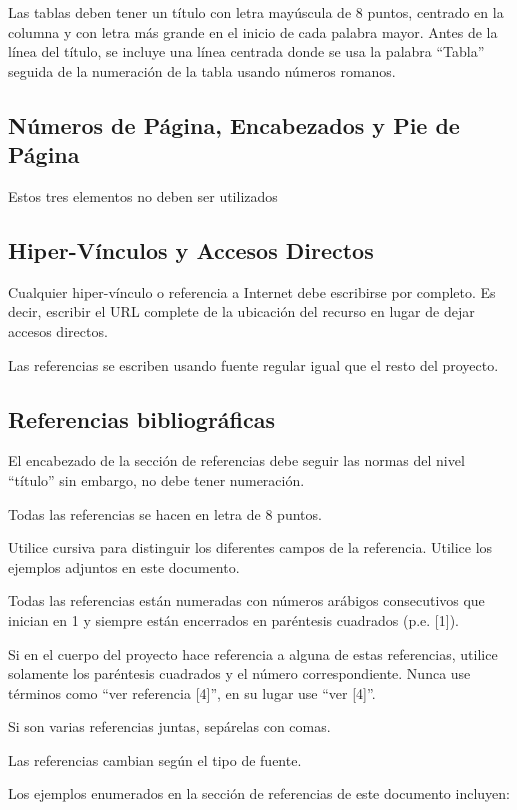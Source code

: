 \documentclass[10pt,twocolumn,letterpaper]{article}
\begin{document}
Las tablas deben tener un título con letra mayúscula de 8 puntos, centrado en la columna y con letra más grande en el inicio de cada palabra mayor. Antes de la línea del título, se incluye una línea centrada donde se usa la palabra “Tabla” seguida de la numeración de la tabla usando números romanos.

\subsection{Números de Página, Encabezados y Pie de Página}
Estos tres elementos no deben ser utilizados

\subsection{Hiper-Vínculos y Accesos Directos}
Cualquier hiper-vínculo o referencia a Internet debe escribirse por completo. Es decir, escribir el URL complete de la ubicación del recurso en lugar de dejar accesos directos.

Las referencias se escriben usando fuente regular igual que el resto del proyecto.

\subsection{Referencias bibliográficas}
El encabezado de la sección de referencias debe seguir las normas del nivel “título” sin embargo, no debe tener numeración.

Todas las referencias se hacen en letra de 8 puntos.

Utilice cursiva para distinguir los diferentes campos de la referencia. Utilice los ejemplos adjuntos en este documento.

Todas las referencias están numeradas con números arábigos consecutivos que inician en 1 y siempre están encerrados en paréntesis cuadrados (p.e. [1]).

Si en el cuerpo del proyecto hace referencia a alguna de estas referencias, utilice solamente los paréntesis cuadrados y el número correspondiente. Nunca use términos como “ver referencia [4]”, en su lugar use “ver [4]”.

Si son varias referencias juntas, sepárelas con comas.

Las referencias cambian según el tipo de fuente.

Los ejemplos enumerados en la sección de referencias de este documento incluyen:
\end{document}
